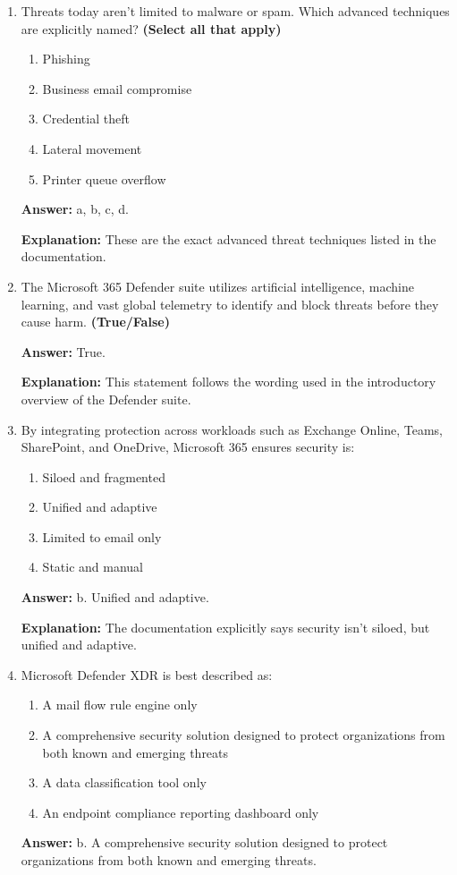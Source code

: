 \documentclass[10pt]{article}
\begin{document}
\begin{enumerate}[leftmargin=*]
\textbf{Explanation:} The documentation says Microsoft 365 brings together tools across email, endpoints, identities, and applications.

\item Threats today aren’t limited to malware or spam. Which advanced techniques are explicitly named? \textbf{(Select all that apply)}
\begin{enumerate}[label=\alph*., leftmargin=1.5em]
\item Phishing
\item Business email compromise
\item Credential theft
\item Lateral movement
\item Printer queue overflow
\end{enumerate}
\textbf{Answer:} a, b, c, d.

\textbf{Explanation:} These are the exact advanced threat techniques listed in the documentation.

\item The Microsoft 365 Defender suite utilizes artificial intelligence, machine learning, and vast global telemetry to identify and block threats before they cause harm. \textbf{(True/False)}

\textbf{Answer:} True.

\textbf{Explanation:} This statement follows the wording used in the introductory overview of the Defender suite.

\item By integrating protection across workloads such as Exchange Online, Teams, SharePoint, and OneDrive, Microsoft 365 ensures security is:
\begin{enumerate}[label=\alph*., leftmargin=1.5em]
\item Siloed and fragmented
\item Unified and adaptive
\item Limited to email only
\item Static and manual
\end{enumerate}
\textbf{Answer:} b. Unified and adaptive.

\textbf{Explanation:} The documentation explicitly says security isn't siloed, but unified and adaptive.

\item Microsoft Defender XDR is best described as:
\begin{enumerate}[label=\alph*., leftmargin=1.5em]
\item A mail flow rule engine only
\item A comprehensive security solution designed to protect organizations from both known and emerging threats
\item A data classification tool only
\item An endpoint compliance reporting dashboard only
\end{enumerate}
\textbf{Answer:} b. A comprehensive security solution designed to protect organizations from both known and emerging threats.


\end{enumerate}
\end{document}
